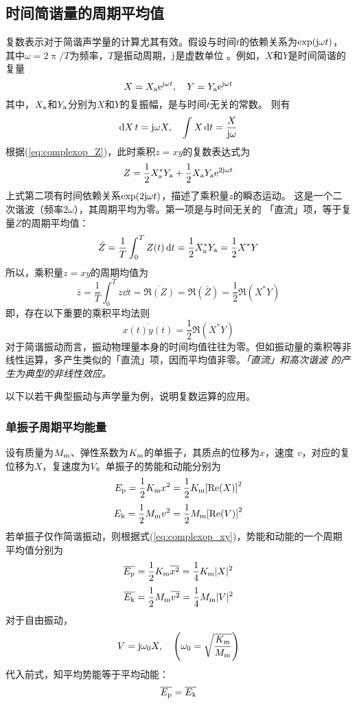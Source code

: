 \documentclass[UTF8]{ctexbook}
\begin{document}
\subsection{时间简谐量的周期平均值}
复数表示对于简谐声学量的计算尤其有效。假设与时间$t$的依赖关系为$\exp(\mathrm{j} 
\omega t)$，其中$\omega = 2\uppi /T$为频率，$T$是振动周期，$\mathrm{j}$是虚数单位
。例如，$X$和$Y$是时间简谐的复量
$$X=X\st{a} \me^{\mj \omega t }\qc Y = Y\st{a}\me^{\mj \omega t}$$
其中，$X_\text{a}$和$Y_\text{a}$分别为$X$和$Y$的复振幅，是与时间$t$无关的常数。
则有
$$\dd{X}{t}=\mj \omega X\qc \int X\dd{t} = \frac{X}{\mj \omega}$$
根据(\ref{eq:complexop_Z})，此时乘积$z=xy$的复数表达式为
$$Z=\frac12 X_\text{a}^* Y_\text{a}+\frac12 X_\text{a}Y_\text{a}\mathrm{e}^{2\mathrm{j} \omega t}$$
上式第二项有时间依赖关系$\exp(2\mathrm{j} \omega  t)$，描述了乘积量$z$的瞬态运动。
这是一个二次谐波（频率$2\omega$），其周期平均为零。第一项是与时间无关的
「直流」项，等于复量$Z$的周期平均值：
$$\bar{Z} = \frac1T \int_0^T Z(t) \dd{t} = \frac12 X_\text{a}^* Y_\text{a} =
\frac12 X^* Y$$
所以，乘积量$z=xy$的周期均值为
$$\bar{z}=\frac1T \int_0^T z\dd{t} = \overline{\Re(Z)} = \Re(\bar{Z})
=\frac12\Re(X^*Y)$$
即，存在以下重要的乘积平均法则
\begin{equation}
	\overline{x(t)y(t)} = \frac12 \Re(X^*Y) \label{eq:complexop_xy}
\end{equation}
对于简谐振动而言，振动物理量本身的时间均值往往为零。但如振动量的乘积等非
线性运算，多产生类似的「直流」项，因而平均值非零。\emph{「直流」和高次谐波
的产生为典型的非线性效应。}

以下以若干典型振动与声学量为例，说明复数运算的应用。

\subsubsection{单振子周期平均能量}
设有质量为$M_\text{m}$、弹性系数为$K_\text{m}$的单振子，其质点的位移为$x$，速度
$v$，对应的复位移为$X$，复速度为$V$。单振子的势能和动能分别为
$$E_\text{p} = \frac12 K_\text{m} x^2 = \frac12 K_\text{m}\qty[\Re(X)]^2$$
$$E_\text{k} = \frac12 M_\text{m} v^2 = \frac12 M_\text{m} \qty[\Re(V)]^2$$
若单振子仅作简谐振动，则根据式(\ref{eq:complexop_xy})，势能和动能的一个周期
平均值分别为
$$\overline{E_\text{p}} = \frac12 K_\text{m} \overline{x^2} = \frac14 K_\text{m}
|X|^2$$
$$\overline{E_\text{k}} = \frac12 M_\text{m} \overline{v^2} = \frac14 M_\text{m}
|V|^2$$
对于自由振动，
$$V = \mj \omega_0 X\qc \qty(\omega_0 = \sqrt{\frac{K\st{m}}{M\st{m}}})$$
代入前式，知平均势能等于平均动能：
$$\overline{E_\text{p}} = \overline{E_\text{k}}$$
\end{document}
